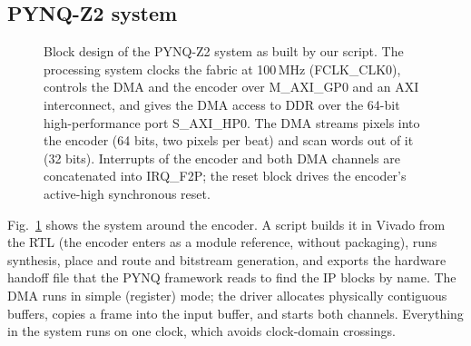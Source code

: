 \subsection{PYNQ-Z2 system}\label{sec:zynq}
\begin{figure}[t]
\centering
\resizebox{\textwidth}{!}{}
\caption{Block design of the PYNQ-Z2 system as built by our script. The processing system clocks the fabric at 100\,MHz (FCLK\_CLK0), controls the DMA and the encoder over M\_AXI\_GP0 and an AXI interconnect, and gives the DMA access to DDR over the 64-bit high-performance port S\_AXI\_HP0. The DMA streams pixels into the encoder (64 bits, two pixels per beat) and scan words out of it (32 bits). Interrupts of the encoder and both DMA channels are concatenated into IRQ\_F2P; the reset block drives the encoder's active-high synchronous reset.}
\label{fig:zynq}
\end{figure}
Fig.~\ref{fig:zynq} shows the system around the encoder. A script builds it in Vivado from the RTL (the encoder enters as a module reference, without packaging), runs synthesis, place and route and bitstream generation, and exports the hardware handoff file that the PYNQ framework reads to find the IP blocks by name. The DMA runs in simple (register) mode; the driver allocates physically contiguous buffers, copies a frame into the input buffer, and starts both channels. Everything in the system runs on one clock, which avoids clock-domain crossings.

